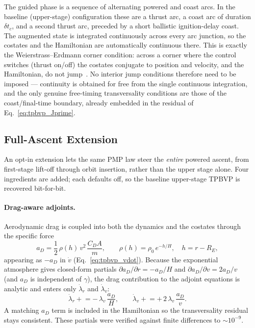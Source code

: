 The guided phase is a sequence of alternating powered and coast arcs.  In the
baseline (upper-stage) configuration these are a thrust arc, a coast arc of
duration $\delta t_c$, and a second thrust arc, preceded by a short ballistic
ignition-delay coast.  The augmented state is integrated continuously across
every arc junction, so the costates and the Hamiltonian are automatically
continuous there.  This is exactly the Weierstrass--Erdmann corner condition:
across a corner where the control switches (thrust on/off) the costates conjugate
to position and velocity, and the Hamiltonian, do not jump~\cite{Pontani2013,GathCalise2001}.
No interior jump conditions therefore need to be imposed --- continuity is
obtained for free from the single continuous integration, and the only genuine
free-timing transversality conditions are those of the coast/final-time boundary,
already embedded in the residual of Eq.~\eqref{eq:tpbvp_Jprime}.

\subsection{Full-Ascent Extension}
\label{ssec:tpbvp_fullascent}

An opt-in extension lets the same PMP law steer the \emph{entire} powered ascent,
from first-stage lift-off through orbit insertion, rather than the upper stage
alone.  Four ingredients are added; each defaults off, so the baseline
upper-stage TPBVP is recovered bit-for-bit.

\paragraph{Drag-aware adjoints.}
Aerodynamic drag is coupled into both the dynamics and the costates through the
specific force
\begin{equation}
  a_D = \frac{1}{2}\,\rho(h)\,v^2\,\frac{C_D A}{m}, \qquad
  \rho(h) = \rho_0\,e^{-h/H}, \quad h = r - R_E,
  \label{eq:tpbvp_drag}
\end{equation}
appearing as $-a_D$ in $\dot v$ (Eq.~\eqref{eq:tpbvp_vdot}).  Because the
exponential atmosphere gives closed-form partials
$\partial a_D/\partial r = -a_D/H$ and $\partial a_D/\partial v = 2a_D/v$
(and $a_D$ is independent of $\gamma$), the drag contribution to the adjoint
equations is analytic and enters only $\dot\lambda_r$ and $\dot\lambda_v$:
\begin{equation}
  \dot\lambda_r \mathrel{+}= -\,\lambda_v\,\frac{a_D}{H}, \qquad
  \dot\lambda_v \mathrel{+}= +\,2\,\lambda_v\,\frac{a_D}{v}.
  \label{eq:tpbvp_drag_adjoint}
\end{equation}
A matching $a_D$ term is included in the Hamiltonian so the transversality
residual stays consistent.  These partials were verified against finite
differences to $\sim\!10^{-9}$.

